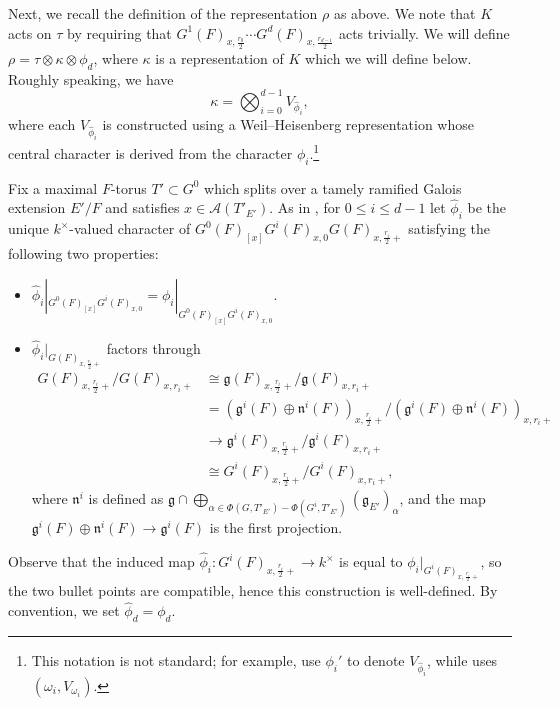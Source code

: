 \documentclass[reqno]{amsart}
\numberwithin{equation}{subsection}
\newcommand{\wh}[1]{\widehat{#1}}
\newcommand{\co}{\colon}
\newcommand\cA{\mathcal{A}}
\theoremstyle{remark}
\numberwithin{equation}{subsection}
\numberwithin{figure}{subsection}
\begin{document}
Next, we recall the definition of the representation $\rho$ as above. We note that $K$ acts on $\tau$ by requiring that $G^1(F)_{x, \frac{r_0}{2}} \cdots G^d(F)_{x, \frac{r_{d-1}}{2}}$ acts trivially. We will define $\rho = \tau \otimes \kappa \otimes \phi_d$, where $\kappa$ is a representation of $K$ which we will define below. Roughly speaking, we have
\[
\kappa = \bigotimes_{i=0}^{d-1} V_{\wh\phi_i},
\]
where each $V_{\wh\phi_i}$ is constructed using a Weil--Heisenberg representation whose central character is derived from the character $\phi_i$.\footnote{This notation is not standard; for example, \cite{HM08} use $\phi_i'$ to denote $V_{\wh\phi_i}$, while \cite{Fin21b} uses $(\omega_i, V_{\omega_i})$.}

Fix a maximal $F$-torus $T' \subset G^0$ which splits over a tamely ramified Galois extension $E'/F$ and satisfies $x \in \cA(T'_{E'})$. As in \cite[\S 4]{Yu01}, for $0 \leq i \leq d-1$ let $\widehat{\phi}_i$ be the unique $k^\times$-valued character of $G^0(F)_{[x]}G^i(F)_{x,0}G(F)_{x,\frac{r_i}{2}+}$ %
satisfying the following two properties:
\begin{itemize}
\item $\widehat{\phi}_i|_{G^0(F)_{[x]}G^i(F)_{x,0}} = \phi_i|_{G^0(F)_{[x]}G^i(F)_{x,0}}$.
\item $\widehat{\phi}_i|_{G(F)_{x, \frac{r_i}{2}+}}$ factors through
\begin{align*}
G(F)_{x, \frac{r_i}{2}+}/G(F)_{x, r_i+} &\cong \mathfrak{g}(F)_{x, \frac{r_i}{2}+}/\mathfrak{g}(F)_{x, r_i+} \\
    &= (\mathfrak{g}^i(F) \oplus \mathfrak{n}^i(F))_{x, \frac{r_i}{2}+}/(\mathfrak{g}^i(F) \oplus \mathfrak{n}^i(F))_{x, r_i+} \\
    &\to \mathfrak{g}^i(F)_{x, \frac{r_i}{2}+}/\mathfrak{g}^i(F)_{x, r_i+} \\
    &\cong G^i(F)_{x, \frac{r_i}{2}+}/G^i(F)_{x, r_i+},
\end{align*}
where $\mathfrak{n}^i$ is defined as $\mathfrak{g} \cap \bigoplus_{\alpha \in \Phi(G, T'_{E'}) - \Phi(G^i, T'_{E'})} (\mathfrak{g}_{E'})_{\alpha}$, and the map $\mathfrak{g}^i(F) \oplus \mathfrak{n}^i(F) \to \mathfrak{g}^i(F)$ is the first projection.
\end{itemize}
Observe that the induced map $\widehat{\phi}_i\co G^i(F)_{x, \frac{r_i}{2}+} \to k^\times$ is equal to $\phi_i|_{G^i(F)_{x,\frac{r_i}{2}+}}$, so the two bullet points are compatible, hence this construction is well-defined. By convention, we set $\wh\phi_d = \phi_d$. 
\end{document}
